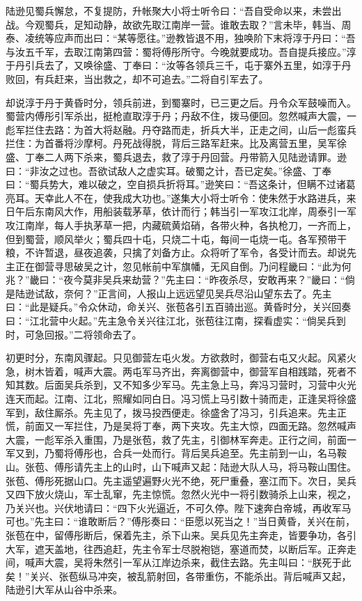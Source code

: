 陆逊见蜀兵懈怠，不复提防，升帐聚大小将士听令曰：“吾自受命以来，未尝出战。今观蜀兵，足知动静，故欲先取江南岸一营。谁敢去取？”言未毕，韩当、周泰、凌统等应声而出曰：“某等愿往。”逊教皆退不用，独唤阶下末将淳于丹曰：“吾与汝五千军，去取江南第四营：蜀将傅彤所守。今晚就要成功。吾自提兵接应。”淳于丹引兵去了，又唤徐盛、丁奉曰：“汝等各领兵三千，屯于寨外五里，如淳于丹败回，有兵赶来，当出救之，却不可追去。”二将自引军去了。

却说淳于丹于黄昏时分，领兵前进，到蜀寨时，已三更之后。丹令众军鼓噪而入。蜀营内傅彤引军杀出，挺枪直取淳于丹；丹敌不住，拨马便回。忽然喊声大震，一彪军拦住去路：为首大将赵融。丹夺路而走，折兵大半，正走之间，山后一彪蛮兵拦住：为首番将沙摩柯。丹死战得脱，背后三路军赶来。比及离营五里，吴军徐盛、丁奉二人两下杀来，蜀兵退去，救了淳于丹回营。丹带箭入见陆逊请罪。逊曰：“非汝之过也。吾欲试敌人之虚实耳。破蜀之计，吾已定矣。”徐盛、丁奉曰：“蜀兵势大，难以破之，空自损兵折将耳。”逊笑曰：“吾这条计，但瞒不过诸葛亮耳。天幸此人不在，使我成大功也。”遂集大小将士听令：使朱然于水路进兵，来日午后东南风大作，用船装载茅草，依计而行；韩当引一军攻江北岸，周泰引一军攻江南岸，每人手执茅草一把，内藏硫黄焰硝，各带火种，各执枪刀，一齐而上，但到蜀营，顺风举火；蜀兵四十屯，只烧二十屯，每间一屯烧一屯。各军预带干粮，不许暂退，昼夜追袭，只擒了刘备方止。众将听了军令，各受计而去。却说先主正在御营寻思破吴之计，忽见帐前中军旗幡，无风自倒。乃问程畿曰：“此为何兆？”畿曰：“夜今莫非吴兵来劫营？”先主曰：“昨夜杀尽，安敢再来？”畿曰：“倘是陆逊试敌，奈何？”正言间，人报山上远远望见吴兵尽沿山望东去了。先主曰：“此是疑兵。”令众休动，命关兴、张苞各引五百骑出巡。黄昏时分，关兴回奏曰：“江北营中火起。”先主急令关兴往江北，张苞往江南，探看虚实：“倘吴兵到时，可急回报。”二将领命去了。

初更时分，东南风骤起。只见御营左屯火发。方欲救时，御营右屯又火起。风紧火急，树木皆着，喊声大震。两屯军马齐出，奔离御营中，御营军自相践踏，死者不知其数。后面吴兵杀到，又不知多少军马。先主急上马，奔冯习营时，习营中火光连天而起。江南、江北，照耀如同白日。冯习慌上马引数十骑而走，正逢吴将徐盛军到，敌住厮杀。先主见了，拨马投西便走。徐盛舍了冯习，引兵追来。先主正慌，前面又一军拦住，乃是吴将丁奉，两下夹攻。先主大惊，四面无路。忽然喊声大震，一彪军杀入重围，乃是张苞，救了先主，引御林军奔走。正行之间，前面一军又到，乃蜀将傅彤也，合兵一处而行。背后吴兵追至。先主前到一山，名马鞍山。张苞、傅彤请先主上的山时，山下喊声又起：陆逊大队人马，将马鞍山围住。张苞、傅彤死据山口。先主遥望遍野火光不绝，死尸重叠，塞江而下。次日，吴兵又四下放火烧山，军士乱窜，先主惊慌。忽然火光中一将引数骑杀上山来，视之，乃关兴也。兴伏地请曰：“四下火光逼近，不可久停。陛下速奔白帝城，再收军马可也。”先主曰：“谁敢断后？”傅彤奏曰：“臣愿以死当之！”当日黄昏，关兴在前，张苞在中，留傅彤断后，保着先主，杀下山来。吴兵见先主奔走，皆要争功，各引大军，遮天盖地，往西追赶，先主令军士尽脱袍铠，塞道而焚，以断后军。正奔走间，喊声大震，吴将朱然引一军从江岸边杀来，截住去路。先主叫曰：“朕死于此矣！”关兴、张苞纵马冲突，被乱箭射回，各带重伤，不能杀出。背后喊声又起，陆逊引大军从山谷中杀来。

